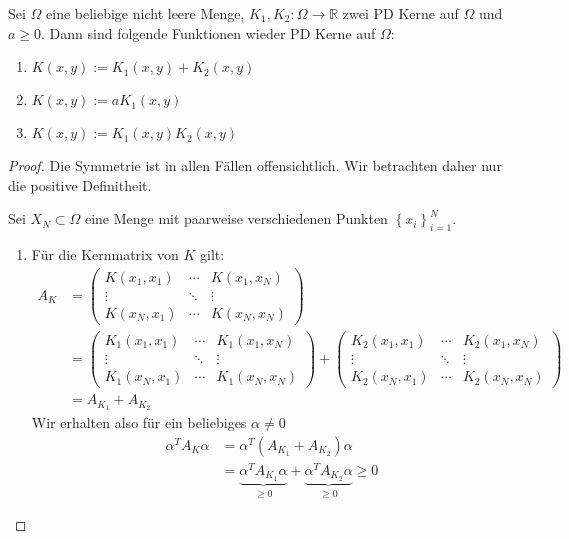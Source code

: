 \begin{theorem}
\label{thm:Kombi}
Sei $\Omega$ eine beliebige nicht leere Menge, $K_1, K_2:\Omega \rightarrow \mathbb{R}$ zwei \ac{PD} Kerne auf $\Omega$ und $a \geq 0$. Dann sind folgende Funktionen wieder \ac{PD} Kerne auf $\Omega$:
\begin{enumerate}
\item
$K(x,y) := K_1(x,y) + K_2(x,y)$
\item
$K(x,y) := aK_1 (x,y)$
\item
$K(x,y) := K_1(x,y)K_2(x,y)$
\end{enumerate}
\end{theorem}
\begin{proof}
Die Symmetrie ist in allen Fällen offensichtlich. Wir betrachten daher nur die positive Definitheit.

Sei $X_N \subset \Omega$ eine Menge mit paarweise verschiedenen Punkten $\left\{x_i\right\}_{i=1}^N$.
\begin{enumerate}
\item
Für die Kernmatrix von $K$ gilt:
\begin{align*}
A_K &= 
\begin{pmatrix}
K(x_1, x_1) & \cdots & K(x_1, x_N) \\ 
\vdots & \ddots & \vdots \\ 
K(x_N, x_1) & \cdots & K(x_N, x_N)
\end{pmatrix} \\
&=
\begin{pmatrix}
K_1(x_1, x_1) & \cdots & K_1(x_1, x_N) \\ 
\vdots & \ddots & \vdots \\ 
K_1(x_N, x_1) & \cdots & K_1(x_N, x_N)
\end{pmatrix} 
+
\begin{pmatrix}
K_2(x_1, x_1) & \cdots & K_2(x_1, x_N) \\ 
\vdots & \ddots & \vdots \\ 
K_2(x_N, x_1) & \cdots & K_2(x_N, x_N)
\end{pmatrix} \\
&= A_{K_1} + A_{K_2}
\end{align*}
Wir erhalten also für ein beliebiges $\alpha \neq 0$
\begin{align*}
\alpha^T A_K \alpha &= \alpha^T \left( A_{K_1} + A_{K_2} \right) \alpha \\
&=\underbrace{\alpha^T A_{K_1} \alpha}_{\geq 0} + \underbrace{\alpha^T A_{K_2} \alpha}_{\geq 0} \geq 0
\end{align*}

\end{enumerate}
\end{proof}
